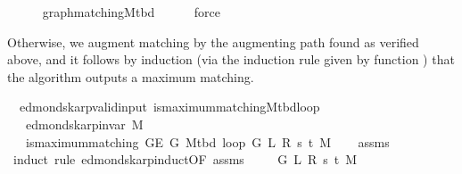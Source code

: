 \begin{isabellebody}
\ \ \ \ \isamarkupfalse%
\ graph{\isacharunderscore}{\kern0pt}matching{\isacharunderscore}{\kern0pt}M{\isacharunderscore}{\kern0pt}tbd\isanewline
\ \ \ \ \isamarkupfalse%
\ force\isanewline
{}\isamarkupfalse%
%
\endisatagproof
{\isafoldproof}%
%
\isadelimproof
%
\endisadelimproof
%
\begin{isamarkuptext}%
Otherwise, we augment matching  by the augmenting path found as verified above, and it
follows by induction (via the induction rule given by function ) that the
algorithm outputs a maximum matching.%
\end{isamarkuptext}\isamarkuptrue%
\isamarkupfalse%
\ {\isacharparenleft}{\kern0pt}\ edmonds{\isacharunderscore}{\kern0pt}karp{\isacharunderscore}{\kern0pt}valid{\isacharunderscore}{\kern0pt}input{\isacharparenright}{\kern0pt}\ is{\isacharunderscore}{\kern0pt}maximum{\isacharunderscore}{\kern0pt}matching{\isacharunderscore}{\kern0pt}M{\isacharunderscore}{\kern0pt}tbd{\isacharunderscore}{\kern0pt}loop{\isacharprime}{\kern0pt}{\isacharcolon}{\kern0pt}\isanewline
\ \ \ {\isachardoublequoteopen}edmonds{\isacharunderscore}{\kern0pt}karp{\isacharunderscore}{\kern0pt}invar{\isacharprime}{\kern0pt}{\isacharprime}{\kern0pt}\ M{\isachardoublequoteclose}\isanewline
\ \ \ {\isachardoublequoteopen}is{\isacharunderscore}{\kern0pt}maximum{\isacharunderscore}{\kern0pt}matching\ {\isacharparenleft}{\kern0pt}G{\isachardot}{\kern0pt}E\ G{\isacharparenright}{\kern0pt}\ {\isacharparenleft}{\kern0pt}M{\isacharunderscore}{\kern0pt}tbd\ {\isacharparenleft}{\kern0pt}loop{\isacharprime}{\kern0pt}\ G\ L\ R\ s\ t\ M{\isacharparenright}{\kern0pt}{\isacharparenright}{\kern0pt}{\isachardoublequoteclose}\isanewline
%
\isadelimproof
\ \ %
\endisadelimproof
%
\isatagproof
{}\isamarkupfalse%
\ assms%
\endisatagproof
{\isafoldproof}%
%
\isadelimproof
\isanewline
%
\endisadelimproof
%
\isadelimvisible
%
\endisadelimvisible
%
\isatagvisible
{}\isamarkupfalse%
\ {\isacharparenleft}{\kern0pt}induct\ rule{\isacharcolon}{\kern0pt}\ edmonds{\isacharunderscore}{\kern0pt}karp{\isacharunderscore}{\kern0pt}induct{\isacharbrackleft}{\kern0pt}OF\ assms{\isacharbrackright}{\kern0pt}{\isacharparenright}{\kern0pt}\isanewline
\ \ \isamarkupfalse%
\ {\isacharparenleft}{\kern0pt}{}\ G\ L\ R\ s\ t\ M{\isacharparenright}{\kern0pt}\isanewline
\ \ \isamarkupfalse%

\end{isabellebody}
